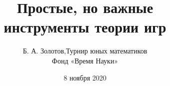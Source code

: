 \documentclass[aspectratio=1610,12pt,notheorems]{beamer}
\title[Introduction to Game Theory]
    {\bfseries Простые, но важные \\ инструменты теории игр}
\author[\ ]
	{Б. А. Золотов,\quad Турнир юных математиков\\ \vspace{0.3cm}
		{\small Фонд «Время Науки»}}
\institute[\ ]{\ }
\date{8 ноября 2020}
\begin{document}
\frame{\titlepage}








\end{document}
